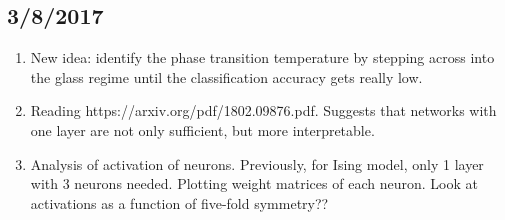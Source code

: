 \documentclass[12pt,reqno]{amsart}
\numberwithin{equation}{section}
\begin{document}
\subsection{3/8/2017}
\begin{enumerate}
\item New idea: identify the phase transition temperature by stepping across into the glass regime until the classification accuracy gets really low.  
\item Reading https://arxiv.org/pdf/1802.09876.pdf.  Suggests that networks with one layer are not only sufficient, but more interpretable.  
\item Analysis of activation of neurons.  Previously, for Ising model, only 1 layer with 3 neurons needed.  Plotting weight matrices of each neuron.  Look at activations as a function of five-fold symmetry??
\end{enumerate}
\end{document}
